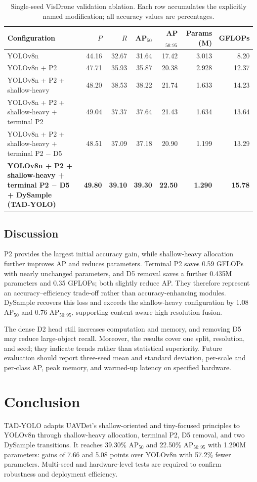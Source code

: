 \documentclass[conference]{IEEEtran}
\begin{document}
\begin{table}[t]
\caption{Single-seed VisDrone validation ablation.  Each row accumulates the
explicitly named modification; all accuracy values are percentages.}
\label{tab:ablation}
\centering
\small
\begin{tabular}{p{7.2cm}rrrrrr}
\toprule
Configuration & $P$ & $R$ & AP$_{50}$ & AP$_{50:95}$ & Params (M) & GFLOPs \\
\midrule
YOLOv8n & 44.16 & 32.67 & 31.64 & 17.42 & 3.013 & 8.20 \\
YOLOv8n + P2 & 47.71 & 35.93 & 35.87 & 20.38 & 2.928 & 12.37 \\
YOLOv8n + P2 + shallow-heavy & 48.20 & 38.53 & 38.22 & 21.74 & 1.633 & 14.23 \\
YOLOv8n + P2 + shallow-heavy + terminal P2 & 49.04 & 37.37 & 37.64 & 21.43 & 1.634 & 13.64 \\
YOLOv8n + P2 + shallow-heavy + terminal P2 $-$ D5 & 48.51 & 37.09 & 37.18 & 20.90 & 1.199 & 13.29 \\
\midrule
\textbf{YOLOv8n + P2 + shallow-heavy + terminal P2 $-$ D5 + DySample
(TAD-YOLO)} & \textbf{49.80} & \textbf{39.10} & \textbf{39.30} &
\textbf{22.50} & \textbf{1.290} & \textbf{15.78} \\
\bottomrule
\end{tabular}
\end{table}

\subsection{Discussion}
P2 provides the largest initial accuracy gain, while shallow-heavy allocation
further improves AP and reduces parameters.  Terminal P2 saves 0.59 GFLOPs
with nearly unchanged parameters, and D5 removal saves a further 0.435M
parameters and 0.35 GFLOPs; both slightly reduce AP.  They therefore represent
an accuracy--efficiency trade-off rather than accuracy-enhancing modules.
DySample recovers this loss and exceeds the shallow-heavy configuration by
1.08 AP$_{50}$ and 0.76
AP$_{50:95}$, supporting content-aware high-resolution fusion.

The dense D2 head still increases computation and memory, and removing D5 may
reduce large-object recall.  Moreover, the results cover one split, resolution,
and seed; they indicate trends rather than statistical superiority.  Future
evaluation should report three-seed mean and standard deviation, per-scale and
per-class AP, peak memory, and warmed-up latency on specified hardware.

\section{Conclusion}
TAD-YOLO adapts UAVDet's shallow-oriented and tiny-focused principles to
YOLOv8n through shallow-heavy allocation, terminal P2, D5 removal, and two
DySample transitions.  It reaches 39.30\% AP$_{50}$ and 22.50\%
AP$_{50:95}$ with 1.290M parameters: gains of 7.66 and 5.08 points over
YOLOv8n with 57.2\% fewer parameters.  Multi-seed and hardware-level tests are
required to confirm robustness and deployment efficiency.



\end{document}
